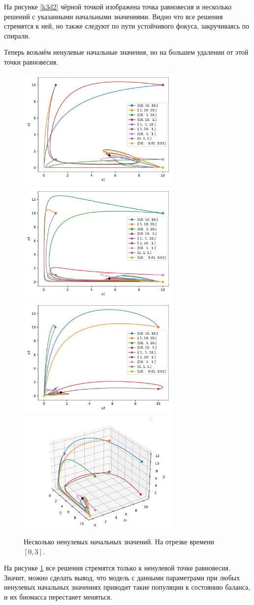     На рисунке \ref{k3d2} чёрной точкой изображена точка равновесия и несколько решений с указанными начальными значениями. Видно что все решения стремятся к ней, но также следуют по пути устойчивого фокуса, закручиваясь по спирали.  
    
    Теперь возьмём ненулевые начальные значения, но на большем удалении от этой точки равновесия.

    
    \begin{figure}[H]
        \centering
        \includegraphics[width=8cm]{pictures/kx_12phase_g2.pdf}
        \includegraphics[width=8cm]{pictures/kx_13phase_g2.pdf}
        \includegraphics[width=8cm]{pictures/kx_23phase_g2.pdf}
        \includegraphics[width=8cm]{pictures/kx_phase3_g2.pdf}
        \caption{Несколько ненулевых начальных значений. На отрезке времени \( [0, 3] \).} \label{k3d3}
    \end{figure}

    На рисунке \ref{k3d3} все решения стремятся только к ненулевой точке равновесия. Значит, можно сделать вывод, что модель с данными параметрами при любых ненулевых начальных значениях приводит такие популяции к состоянию баланса, и их биомасса перестанет меняться. 

